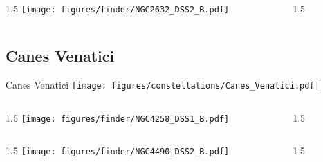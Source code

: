 \documentclass[final]{beamer}
\newlength{\colwidth}
\begin{document}
\begin{frame}[t]{}
  \begin{columns}[T]
    \begin{column}{1.5\colwidth}
      \centering
      \texttt{[image: figures/finder/NGC2632\_DSS2\_B.pdf]}
    \end{column}
    \begin{column}{1.5\colwidth}
      \Large
      
    \end{column}
  \end{columns}
  \vspace{\fill}
\end{frame}

\subsection{Canes Venatici}

\begin{frame}[t]{\LARGE Canes Venatici}
  \centering
  \texttt{[image: figures/constellations/Canes\_Venatici.pdf]}
\end{frame}


\begin{frame}[t]{}
  \begin{columns}[T]
    \begin{column}{1.5\colwidth}
      \centering
      \texttt{[image: figures/finder/NGC4258\_DSS1\_B.pdf]}
    \end{column}
    \begin{column}{1.5\colwidth}
      \Large
      
    \end{column}
  \end{columns}
  \vspace{\fill}
  \begin{columns}[T]
    \begin{column}{1.5\colwidth}
      \centering
      \texttt{[image: figures/finder/NGC4490\_DSS2\_B.pdf]}
    \end{column}
    \begin{column}{1.5\colwidth}
      \Large
      
    \end{column}
  \end{columns}
\end{frame}
\end{document}

